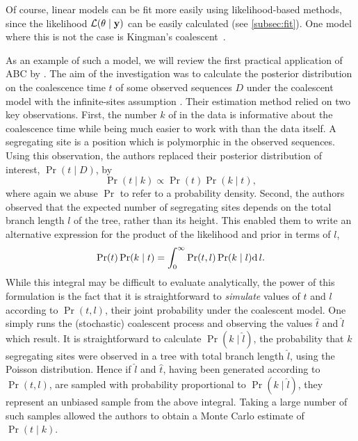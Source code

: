 Of course, linear models can be fit more easily using likelihood-based methods, 
since the likelihood $\mathcal{L}(\theta \mid \mathbf{y})$ can be easily calculated (see
\cref{subsec:fit}). One model where this is not the case is Kingman's
coalescent~\autocite{kingman1982coalescent}. 

As an example of such a model, we will review the first practical application
of \gls{ABC} by \textcite{tavare1997inferring}. The aim of the investigation
was to calculate the posterior distribution on the coalescence time $t$ of some
observed sequences $D$ under the coalescent model
\autocite{kingman1982coalescent} with the infinite-sites assumption
\autocite{watterson1975number}. Their estimation method relied on two key
observations. First, the number $k$ of  in the data is
informative about the coalescence time while being much easier to work with
than the data itself. A segregating site is a position which is polymorphic in
the observed sequences. Using this observation, the authors replaced their
posterior distribution of interest, $\Pr(t \mid D)$, by
\[
  \Pr(t \mid k) \propto \Pr(t) \Pr(k \mid t),
\]
where again we abuse $\Pr$ to refer to a probability density. Second,
the authors observed that the expected number of segregating sites depends on
the total branch length $l$ of the tree, rather than its height. This enabled
them to write an alternative expression for the product of the likelihood and
prior in terms of $l$,
\[
  \Pr(t) \Pr(k \mid t) = \int_0^\infty \Pr(t, l) \Pr(k \mid l) \mathrm{d}\, l.
\]
While this integral may be difficult to evaluate analytically, the power of
this formulation is the fact that it is straightforward to \emph{simulate}
values of $t$ and $l$ according to $\Pr(t, l)$, their joint probability under
the coalescent model. One simply runs the (stochastic) coalescent process and
observing the values $\hat{t}$ and $\hat{l}$ which result. It is
straightforward to calculate $\Pr(k \mid \hat{l})$, the probability
that $k$ segregating sites were observed in a tree with total branch length
$\hat{l}$, using the Poisson distribution. Hence if $\hat{l}$ and $\hat{t}$,
having been generated according to $\Pr(t, l)$, are sampled with probability
proportional to $\Pr(k \mid \hat{l})$, they represent an unbiased sample from
the above integral. Taking a large number of such samples allowed the authors
to obtain a Monte Carlo estimate of $\Pr(t \mid k)$.


